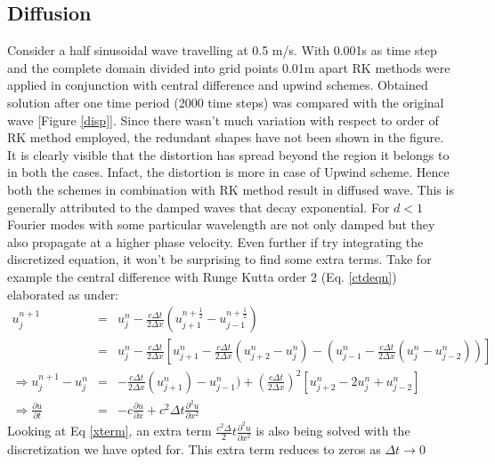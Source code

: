 \documentclass[a4paper,12pt]{report}
\begin{document}
\subsection{Diffusion}
Consider a half sinusoidal wave travelling at 0.5 m/s. With 0.001s as time step and the complete domain divided into grid points 0.01m apart RK methods were applied in conjunction with central difference and upwind schemes. Obtained solution after one time period (2000 time steps) was compared with the original wave [Figure \ref{disp}]. Since there wasn't much variation with respect to order of RK method employed, the redundant shapes have not been shown in the figure. It is clearly visible that the distortion has spread beyond the region it belongs to in both the cases. Infact, the distortion is more in case of Upwind scheme. Hence both the schemes in combination with RK method result in diffused wave. This is generally attributed to the damped waves that decay exponential\cite{it1}. For $d<1$ Fourier modes with some particular wavelength are not only damped but they also propagate at a higher phase velocity. Even further if try integrating the discretized equation, it won't be surprising to find some extra terms. Take for example the central difference with Runge Kutta order 2 (Eq. \ref{ctdeqn}) elaborated as under:
\begin{eqnarray}
u_{j}^{n+1} &=& u_{j}^{n} - \frac{c\Delta t}{2\Delta x}(u_{j+1}^{n+\frac{1}{2}} - u_{j-1}^{n+\frac{1}{2}}) \label{ctdrk2} \\
&=& u_{j}^{n} - \frac{c\Delta t}{2\Delta x}[u_{j+1}^{n}- \frac{c\Delta t}{2\Delta x}(u_{j+2}^{n}-u_{j}^{n}) - (u_{j-1}^{n}-\frac{c\Delta t}{2\Delta x}(u_{j}^{n}-u_{j-2}^{n}))] \nonumber \\
\Rightarrow u_{j}^{n+1}- u_{j}^{n} &=& - \frac{c\Delta t}{2\Delta x}(u_{j+1}^{n})-u_{j-1}^{n}) +(\frac{c\Delta t}{2\Delta x})^2[u_{j+2}^{n}-2u_{j}^{n}+u_{j-2}^{n}] \nonumber \\
\Rightarrow \frac{\partial u}{\partial t} &=& -c\frac{\partial u}{\partial x} + c^2\Delta t\frac{\partial^2 u}{\partial x^2} \label{xterm}
\end{eqnarray}
Looking at Eq \ref{xterm}, an extra term $\frac{c^2\Delta}{2} t\frac{\partial^2 u}{\partial x^2}$ is also being solved with the discretization we have opted for. This extra term reduces to zeros as $\Delta t \rightarrow 0$
\end{document}
